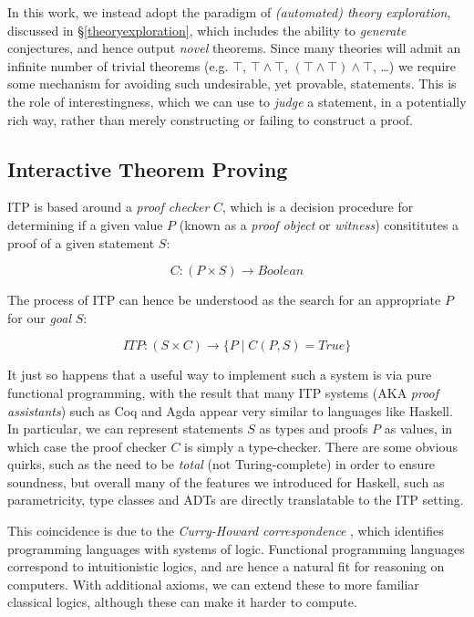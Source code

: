In this work, we instead adopt the paradigm of \emph{(automated) theory exploration}, discussed in \S \ref{theoryexploration}, which includes the ability to \emph{generate} conjectures, and hence output \emph{novel} theorems. Since many theories will admit an infinite number of trivial theorems (e.g. $\top$, $\top \land \top$, $(\top \land \top) \land \top$, \dots) we require some mechanism for avoiding such undesirable, yet provable, statements. This is the role of interestingness, which we can use to \emph{judge} a statement, in a potentially rich way, rather than merely constructing or failing to construct a proof.

\fi

\subsection{Interactive Theorem Proving}
\label{itp}

ITP is based around a \emph{proof checker} $C$, which is a decision procedure for determining if a given value $P$ (known as a \emph{proof object} or \emph{witness}) consititutes a proof of a given statement $S$:

$$ C \colon (P \times S) \rightarrow Boolean $$

The process of ITP can hence be understood as the search for an appropriate $P$ for our \emph{goal} $S$:

$$ ITP \colon (S \times C) \rightarrow \{ P \mid C(P, S) = True \} $$

It just so happens that a useful way to implement such a system is via pure functional programming, with the result that many ITP systems (AKA \emph{proof assistants}) such as Coq and Agda appear very similar to languages like Haskell. In particular, we can represent statements $S$ as types and proofs $P$ as values, in which case the proof checker $C$ is simply a type-checker. There are some obvious quirks, such as the need to be \emph{total} (not Turing-complete) in order to ensure soundness, but overall many of the features we introduced for Haskell, such as parametricity, type classes and ADTs are directly translatable to the ITP setting.

This coincidence is due to the \emph{Curry-Howard correspondence} \citep{wadler2015propositions}, which identifies programming languages with systems of logic. Functional programming languages correspond to intuitionistic logics, and are hence a natural fit for reasoning on computers. With additional axioms, we can extend these to more familiar classical logics, although these can make it harder to compute.

